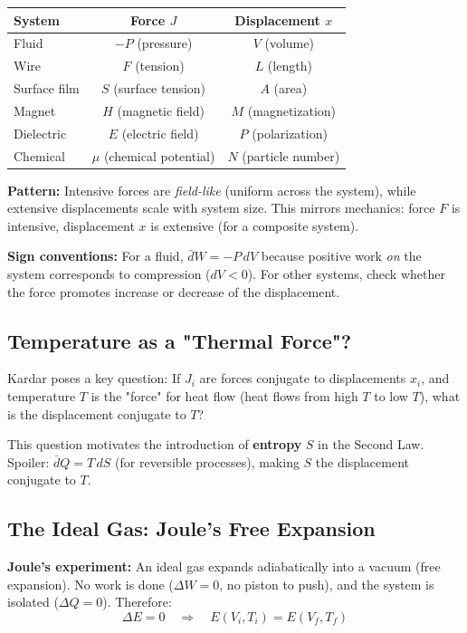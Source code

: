 \documentclass[9pt,twocoloumn]{article}
\begin{document}
\begin{center}
\begin{tabular}{lcc}
\hline
System & Force $J$ & Displacement $x$ \\
\hline
Fluid & $-P$ (pressure) & $V$ (volume) \\
Wire & $F$ (tension) & $L$ (length) \\
Surface film & $S$ (surface tension) & $A$ (area) \\
Magnet & $H$ (magnetic field) & $M$ (magnetization) \\
Dielectric & $E$ (electric field) & $P$ (polarization) \\
Chemical & $\mu$ (chemical potential) & $N$ (particle number) \\
\hline
\end{tabular}
\end{center}

\textbf{Pattern:} Intensive forces are \emph{field-like} (uniform across the system), while extensive displacements scale with system size. This mirrors mechanics: force $F$ is intensive, displacement $x$ is extensive (for a composite system).

\textbf{Sign conventions:} For a fluid, $\bar{d}W = -P \, dV$ because positive work \emph{on} the system corresponds to compression ($dV < 0$). For other systems, check whether the force promotes increase or decrease of the displacement.

\subsection{Temperature as a "Thermal Force"?}
Kardar poses a key question: If $J_i$ are forces conjugate to displacements $x_i$, and temperature $T$ is the "force" for heat flow (heat flows from high $T$ to low $T$), what is the displacement conjugate to $T$?

This question motivates the introduction of \textbf{entropy} $S$ in the Second Law. Spoiler: $\bar{d}Q = T \, dS$ (for reversible processes), making $S$ the displacement conjugate to $T$.

\subsection{The Ideal Gas: Joule's Free Expansion}
\textbf{Joule's experiment:} An ideal gas expands adiabatically into a vacuum (free expansion). No work is done ($\Delta W = 0$, no piston to push), and the system is isolated ($\Delta Q = 0$). Therefore:
\begin{equation}
\Delta E = 0 \quad \Rightarrow \quad E(V_i, T_i) = E(V_f, T_f)
\end{equation}
\end{document}
